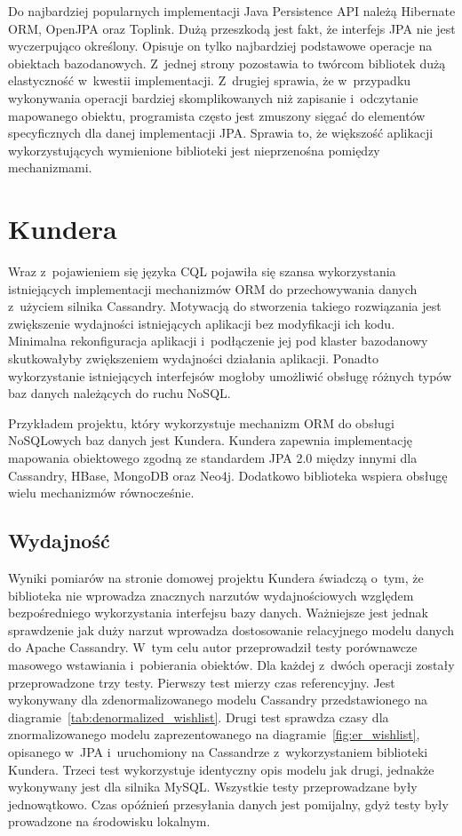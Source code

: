 Do najbardziej popularnych implementacji Java Persistence API należą Hibernate ORM, OpenJPA oraz Toplink. Dużą przeszkodą jest fakt, że interfejs JPA nie jest wyczerpująco określony. Opisuje on tylko najbardziej podstawowe operacje na obiektach bazodanowych. Z~jednej strony pozostawia to twórcom bibliotek dużą elastyczność w~kwestii implementacji. Z~drugiej sprawia, że w~przypadku wykonywania operacji bardziej skomplikowanych niż zapisanie i~odczytanie mapowanego obiektu, programista często jest zmuszony sięgać do elementów specyficznych dla danej implementacji JPA. Sprawia to, że większość aplikacji wykorzystujących wymienione biblioteki jest nieprzenośna pomiędzy mechanizmami.

\section{Kundera}
\label{sec:kundera}

Wraz z~pojawieniem się języka CQL pojawiła się szansa wykorzystania istniejących implementacji mechanizmów ORM do przechowywania danych z~użyciem silnika Cassandry. Motywacją do stworzenia takiego rozwiązania jest zwiększenie wydajności istniejących aplikacji bez modyfikacji ich kodu. Minimalna rekonfiguracja aplikacji i~podłączenie jej pod klaster bazodanowy skutkowałyby zwiększeniem wydajności działania aplikacji. Ponadto wykorzystanie istniejących interfejsów mogłoby umożliwić obsługę różnych typów baz danych należących do ruchu NoSQL. 

Przykładem projektu, który wykorzystuje mechanizm ORM do obsługi NoSQLowych baz danych jest Kundera.\cite{kundera_home} Kundera zapewnia implementację mapowania obiektowego zgodną ze standardem JPA 2.0 między innymi dla Cassandry, HBase, MongoDB oraz Neo4j. Dodatkowo biblioteka wspiera obsługę wielu mechanizmów równocześnie.

\subsection{Wydajność}
\label{sec:kundera_performance}

Wyniki pomiarów na stronie domowej projektu Kundera świadczą o~tym, że biblioteka nie wprowadza znacznych narzutów wydajnościowych względem bezpośredniego wykorzystania interfejsu bazy danych. Ważniejsze jest jednak sprawdzenie jak duży narzut wprowadza dostosowanie relacyjnego modelu danych do Apache Cassandry. W~tym celu autor przeprowadził testy porównawcze masowego wstawiania i~pobierania obiektów. Dla każdej z~dwóch operacji zostały przeprowadzone trzy testy. Pierwszy test mierzy czas referencyjny. Jest wykonywany dla zdenormalizowanego modelu Cassandry przedstawionego na diagramie~\ref{tab:denormalized_wishlist}. Drugi test sprawdza czasy dla znormalizowanego modelu zaprezentowanego na diagramie~\ref{fig:er_wishlist}, opisanego w~JPA i~uruchomiony na Cassandrze z~wykorzystaniem biblioteki Kundera. Trzeci test wykorzystuje identyczny opis modelu jak drugi, jednakże wykonywany jest dla silnika MySQL. Wszystkie testy przeprowadzane były jednowątkowo. Czas opóźnień przesyłania danych jest pomijalny, gdyż testy były prowadzone na środowisku lokalnym.

